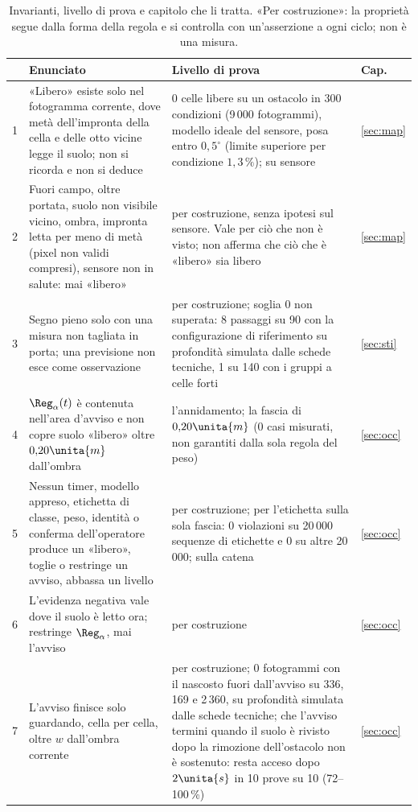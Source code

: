 \begin{table}[H]\centering\footnotesize
\caption{Invarianti, livello di prova e capitolo che li tratta. «Per costruzione»: la proprietà segue dalla forma della regola e si controlla con un'asserzione a ogni ciclo; non è una misura.}\label{tab:lim-invarianti}
\begin{tabularx}{\linewidth}{@{}rLLp{1.1cm}@{}}
\toprule
 & Enunciato & Livello di prova & Cap.\\
 & «Libero» esiste solo nel fotogramma corrente, dove metà dell'impronta della cella e delle otto vicine legge il suolo; non si ricorda e non si deduce &  0 celle libere su un ostacolo in 300 condizioni (9\,000 fotogrammi), modello ideale del sensore, posa entro $0{,}5^\circ$ (limite superiore per condizione $1{,}3\,\%$);  su sensore & \ref{sec:map}\\
2 & Fuori campo, oltre portata, suolo non visibile vicino, ombra, impronta letta per meno di metà (pixel non validi compresi), sensore non in salute: mai «libero» &  per costruzione, senza ipotesi sul sensore. Vale per ciò che non è visto; non afferma che ciò che è «libero» sia libero & \ref{sec:map}\\
3 & Segno pieno solo con una misura non tagliata in porta; una previsione non esce come osservazione & per costruzione; soglia 0 non superata: 8 passaggi su 90 con la configurazione di riferimento su profondità simulata dalle schede tecniche, 1 su 140 con i gruppi a celle forti  & \ref{sec:sti}\\
4 & $\Reg_\alpha(t)$ è contenuta nell'area d'avviso e non copre suolo «libero» oltre $0{,}20\unita{m}$ dall'ombra &  l'annidamento;  la fascia di $0{,}20\unita{m}$ (0 casi misurati, non garantiti dalla sola regola del peso) & \ref{sec:occ}\\
5 & Nessun timer, modello appreso, etichetta di classe, peso, identità o conferma dell'operatore produce un «libero», toglie o restringe un avviso, abbassa un livello & per costruzione; per l'etichetta  sulla sola fascia: 0 violazioni su 20\,000 sequenze di etichette e 0 su altre 20\,000;  sulla catena & \ref{sec:occ}\\
6 & L'evidenza negativa vale dove il suolo è letto ora; restringe $\Reg_\alpha$, mai l'avviso & per costruzione & \ref{sec:occ}\\
7 & L'avviso finisce solo guardando, cella per cella, oltre $w$ dall'ombra corrente & per costruzione;  0 fotogrammi con il nascosto fuori dall'avviso su 336, 169 e 2\,360, su profondità simulata dalle schede tecniche; che l'avviso termini quando il suolo è rivisto dopo la rimozione dell'ostacolo non è sostenuto: resta acceso dopo $2\unita{s}$ in 10 prove su 10 (72--100\,\%) & \ref{sec:occ}\\

\end{tabularx}
\end{table}
